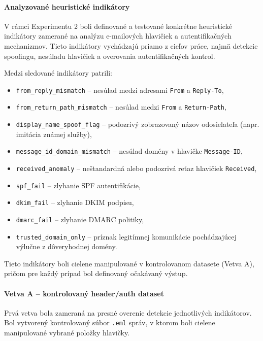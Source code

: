 \documentclass[conference]{IEEEtran}
\begin{document}
\paragraph{Analyzované heuristické indikátory}

V rámci Experimentu 2 boli definované a testované konkrétne heuristické indikátory zamerané na analýzu e-mailových hlavičiek a autentifikačných mechanizmov. Tieto indikátory vychádzajú priamo z cieľov práce, najmä detekcie spoofingu, nesúladu hlavičiek a overovania autentifikačných kontrol.

Medzi sledované indikátory patrili:

\begin{itemize}
    \item \texttt{from\_reply\_mismatch} – nesúlad medzi adresami \texttt{From} a \texttt{Reply-To},
    \item \texttt{from\_return\_path\_mismatch} – nesúlad medzi \texttt{From} a \texttt{Return-Path},
    \item \texttt{display\_name\_spoof\_flag} – podozrivý zobrazovaný názov odosielateľa (napr. imitácia známej služby),
    \item \texttt{message\_id\_domain\_mismatch} – nesúlad domény v hlavičke \texttt{Message-ID},
    \item \texttt{received\_anomaly} – neštandardná alebo podozrivá reťaz hlavičiek \texttt{Received},
    \item \texttt{spf\_fail} – zlyhanie SPF autentifikácie,
    \item \texttt{dkim\_fail} – zlyhanie DKIM podpisu,
    \item \texttt{dmarc\_fail} – zlyhanie DMARC politiky,
    \item \texttt{trusted\_domain\_only} – príznak legitímnej komunikácie pochádzajúcej výlučne z dôveryhodnej domény.
\end{itemize}

Tieto indikátory boli cielene manipulované v kontrolovanom datasete (Vetva A), pričom pre každý prípad bol definovaný očakávaný výstup.


\paragraph{Vetva A – kontrolovaný header/auth dataset}

Prvá vetva bola zameraná na presné overenie detekcie jednotlivých indikátorov. 
Bol vytvorený kontrolovaný súbor \texttt{.eml} správ, v ktorom boli cielene manipulované vybrané položky hlavičky.
\end{document}
